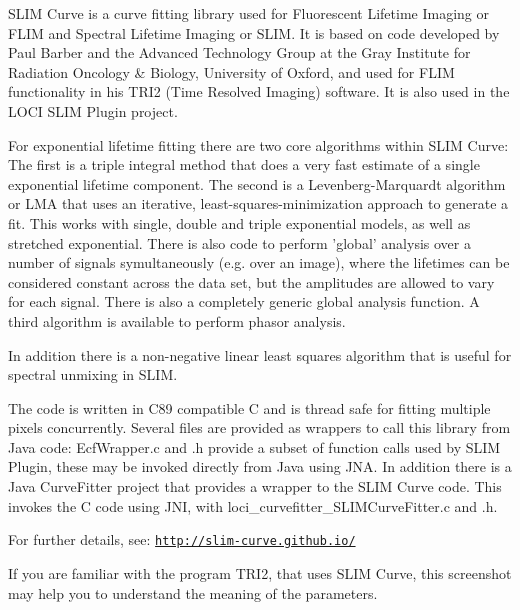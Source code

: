 S\-L\-I\-M Curve is a curve fitting library used for Fluorescent Lifetime Imaging or F\-L\-I\-M and Spectral Lifetime Imaging or S\-L\-I\-M. It is based on code developed by Paul Barber and the Advanced Technology Group at the Gray Institute for Radiation Oncology \& Biology, University of Oxford, and used for F\-L\-I\-M functionality in his T\-R\-I2 (Time Resolved Imaging) software. It is also used in the L\-O\-C\-I S\-L\-I\-M Plugin project.

For exponential lifetime fitting there are two core algorithms within S\-L\-I\-M Curve\-: The first is a triple integral method that does a very fast estimate of a single exponential lifetime component. The second is a Levenberg-\/\-Marquardt algorithm or L\-M\-A that uses an iterative, least-\/squares-\/minimization approach to generate a fit. This works with single, double and triple exponential models, as well as stretched exponential. There is also code to perform 'global' analysis over a number of signals symultaneously (e.\-g. over an image), where the lifetimes can be considered constant across the data set, but the amplitudes are allowed to vary for each signal. There is also a completely generic global analysis function. A third algorithm is available to perform phasor analysis.

In addition there is a non-\/negative linear least squares algorithm that is useful for spectral unmixing in S\-L\-I\-M.

The code is written in C89 compatible C and is thread safe for fitting multiple pixels concurrently. Several files are provided as wrappers to call this library from Java code\-: Ecf\-Wrapper.\-c and .h provide a subset of function calls used by S\-L\-I\-M Plugin, these may be invoked directly from Java using J\-N\-A. In addition there is a Java Curve\-Fitter project that provides a wrapper to the S\-L\-I\-M Curve code. This invokes the C code using J\-N\-I, with loci\-\_\-curvefitter\-\_\-\-S\-L\-I\-M\-Curve\-Fitter.\-c and .h.

For further details, see\-: \href{http://slim-curve.github.io/}{\tt http\-://slim-\/curve.\-github.\-io/}

If you are familiar with the program T\-R\-I2, that uses S\-L\-I\-M Curve, this screenshot may help you to understand the meaning of the parameters.

